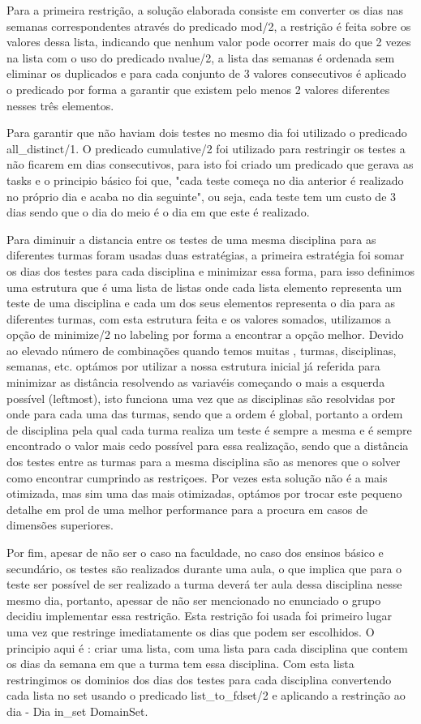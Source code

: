 \documentclass{llncs}
\begin{document}
Para a primeira restrição, a solução elaborada consiste em converter os dias nas semanas correspondentes através do predicado mod/2, a restrição é feita sobre os valores dessa lista, indicando que nenhum valor pode ocorrer mais do que 2 vezes na lista com o uso do predicado nvalue/2, a lista das semanas é ordenada sem eliminar os duplicados e para cada conjunto de 3 valores consecutivos é aplicado o predicado por forma a garantir que existem pelo menos 2 valores diferentes nesses três elementos.

Para garantir que não haviam dois testes no mesmo dia foi utilizado o predicado all\_distinct/1. O predicado cumulative/2 foi utilizado para restringir os testes a não ficarem em dias consecutivos, para isto foi criado um predicado que gerava as tasks e o principio básico foi que, "cada teste começa no dia anterior é realizado no próprio dia e acaba no dia seguinte", ou seja, cada teste tem um custo de 3 dias sendo que o dia do meio é o dia em que este é realizado.

Para diminuir a distancia entre os testes de uma mesma disciplina para as diferentes turmas foram usadas duas estratégias, a primeira estratégia foi somar os dias dos testes para cada disciplina e minimizar essa forma, para isso definimos uma estrutura que é uma lista de listas onde cada lista elemento representa um teste de uma disciplina e cada um dos seus elementos representa o dia para as diferentes turmas, com esta estrutura feita e os valores somados, utilizamos a opção de minimize/2 no labeling por forma a encontrar a opção melhor. Devido ao elevado número de combinações quando temos muitas , turmas, disciplinas, semanas, etc. optámos por utilizar a nossa estrutura inicial já referida para minimizar as distância resolvendo as variavéis começando o mais a esquerda possível (leftmost), isto funciona uma vez que as disciplinas são resolvidas por onde para cada uma das turmas, sendo que a ordem é global, portanto a ordem de disciplina pela qual cada turma realiza um teste é sempre a mesma e é sempre encontrado o valor mais cedo possível para essa realização, sendo que a distância dos testes entre as turmas para a mesma disciplina são as menores que o solver como encontrar cumprindo as restriçoes. Por vezes esta solução não é a mais otimizada, mas sim uma das mais otimizadas, optámos por trocar este pequeno detalhe em prol de uma melhor performance para a procura em casos de dimensões superiores.

Por fim, apesar de não ser o caso na faculdade, no caso dos ensinos básico e secundário, os testes são realizados durante uma aula, o que implica que para o teste ser possível de ser realizado a turma deverá ter aula dessa disciplina nesse mesmo dia, portanto, apessar de não ser mencionado no enunciado o grupo decidiu implementar essa restrição. Esta restrição foi usada foi primeiro lugar uma vez que restringe imediatamente os dias que podem ser escolhidos. O principio aqui é : criar uma lista, com uma lista para cada disciplina que contem os dias da semana em que a turma tem essa disciplina. Com esta lista restringimos os dominios dos dias dos testes para cada disciplina convertendo cada lista no set usando o predicado list\_to\_fdset/2  e aplicando a restrinção ao dia - Dia in\_set DomainSet.
\end{document}
